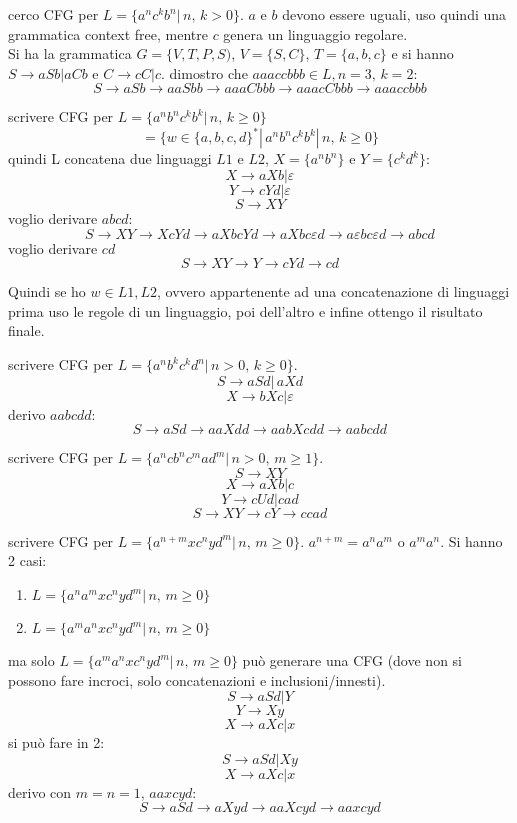 \begin{example}
	cerco CFG per $L=\{a^n c^k b^n|\,n,\,k>0\}$. $a$ e $b$ devono essere uguali, uso quindi una grammatica context free, mentre $c$ genera un linguaggio regolare.\\
	Si ha la grammatica $G=\{V,T,P,S)$, $V=\{S,C\}$, $T=\{a,b,c\}$ e si hanno $S\to aSb|aCb$ e $C\to cC|c$. dimostro che $aaaccbbb\in L, n=3,\, k=2$:
	$$S\to aSb \to aaSbb\to aaaCbbb\to aaacCbbb\to aaaccbbb$$
\end{example}
\begin{example}
	scrivere CFG per $L=\{a^nb^nc^kb^k|\, n,\,k\geq 0\}
	$
	$$=\{w\in\{a,b,c,d\}^*|\,a^nb^nc^kb^k|\, n,\,k\geq 0\}$$
	quindi L concatena due linguaggi $L1$ e $L2$, $X=\{a^nb^n\}$ e $Y=\{c^kd^k\}$:
	$$X\to aXb | \varepsilon$$
	$$Y\to cYd | \varepsilon$$
	$$S\to XY$$
	voglio derivare $abcd$:
	$$S\to XY \to XcYd\to aXbcYd\to aXbc\varepsilon d\to a\varepsilon bc\varepsilon d\to abcd$$
	voglio derivare $cd$
	$$S\to XY\to Y\to cYd\to cd$$
\end{example}
Quindi se ho $w\in L1, L2$, ovvero appartenente ad una concatenazione di linguaggi prima uso le regole di un linguaggio, poi dell'altro e infine ottengo il risultato finale.\\
\begin{example}
	scrivere CFG per $L=\{a^nb^kc^kd^n|\, n>0,\, k\geq 0\}
	$.
	$$S\to aSd|\, aXd$$
	$$X\to bXc| \varepsilon$$
	derivo $aabcdd$:
	$$S\to aSd\to aaXdd\to aabXcdd\to aabcdd$$
\end{example}
\begin{example}
	scrivere CFG per $L=\{a^ncb^nc^mad^m|\, n>0,\, m\geq 1\}
	$.
	$$S\to XY$$
	$$X\to aXb|c$$
	$$Y\to cUd| cad$$
	$$S\to XY\to cY\to ccad$$
\end{example}
\begin{example}
	scrivere CFG per $L=\{a^{n+m}xc^nyd^m|\, n,\, m\geq 0\}
	$. $a^{n+m}=a^na^m \mbox{ o } a^ma^n$. Si hanno 2 casi:
	\begin{enumerate}
		\item $L=\{a^na^m xc^nyd^m|\, n,\, m\geq 0\}
					$
		\item $L=\{a^ma^n xc^nyd^m|\, n,\, m\geq 0\}
					$
	\end{enumerate}
	ma solo  $L=\{a^ma^n xc^nyd^m|\, n,\, m\geq 0\}
	$ può generare una CFG (dove non si possono fare incroci, solo concatenazioni e inclusioni/innesti).
	$$S\to aSd| Y$$
	$$Y\to Xy$$
	$$X\to aXc|x$$
	si può fare in 2:
	$$S\to aSd| Xy$$
	$$X\to aXc|x$$
	derivo con $m=n=1$, $aaxcyd$:
	$$S\to aSd\to aXyd\to aaXcyd\to aaxcyd$$
\end{example}

